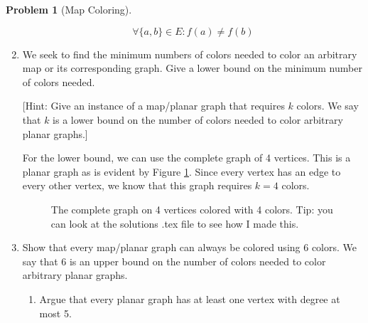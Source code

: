 \documentclass{article}
\theoremstyle{plain}
\theoremstyle{definition}
\newtheorem{problem}{Problem}
\begin{document}
\begin{problem}[Map Coloring]
\begin{enumerate}
        \begin{solution}
            \[\forall \{a,b\} \in E : f(a) \neq f(b)\]
        \end{solution}

        \item We seek to find the minimum numbers of colors needed to color an arbitrary map or its corresponding graph. Give a lower bound on the minimum number of colors needed.

        [Hint: Give an instance of a map/planar graph that requires \(k\) colors. We say that \(k\) is a lower bound on the number of colors needed to color arbitrary planar graphs.]

        \begin{solution}
            For the lower bound, we can use the complete graph of 4 vertices. This is a planar graph as is evident by Figure \ref{fig1}. Since every vertex has an edge to every other vertex, we know that this graph requires \(k = 4\) colors.

            \begin{figure}[ht]
                \centering
                \caption{The complete graph on 4 vertices colored with 4 colors. Tip: you can look at the solutions .tex file to see how I made this.}
                \label{fig1}
            \end{figure}
        \end{solution}

        \item Show that every map/planar graph can always be colored using 6 colors. We say that 6 is an upper bound on the number of colors needed to color arbitrary planar graphs. 

        \begin{enumerate}
            \item\label{part_degree_most_5} Argue that every planar graph has at least one vertex with degree at most 5.
            

\end{enumerate}
\end{enumerate}
\end{problem}
\end{document}
